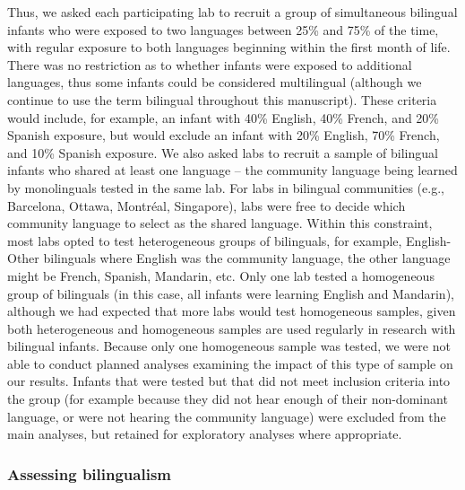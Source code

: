 \documentclass[,man,floatsintext]{apa6}
\begin{document}
Thus, we asked each participating lab to recruit a group of simultaneous bilingual infants who were exposed to two languages between 25\% and 75\% of the time, with regular exposure to both languages beginning within the first month of life. There was no restriction as to whether infants were exposed to additional languages, thus some infants could be considered multilingual (although we continue to use the term bilingual throughout this manuscript). These criteria would include, for example, an infant with 40\% English, 40\% French, and 20\% Spanish exposure, but would exclude an infant with 20\% English, 70\% French, and 10\% Spanish exposure. We also asked labs to recruit a sample of bilingual infants who shared at least one language -- the community language being learned by monolinguals tested in the same lab. For labs in bilingual communities (e.g., Barcelona, Ottawa, Montréal, Singapore), labs were free to decide which community language to select as the shared language. Within this constraint, most labs opted to test heterogeneous groups of bilinguals, for example, English-Other bilinguals where English was the community language, the other language might be French, Spanish, Mandarin, etc. Only one lab tested a homogeneous group of bilinguals (in this case, all infants were learning English and Mandarin), although we had expected that more labs would test homogeneous samples, given both heterogeneous and homogeneous samples are used regularly in research with bilingual infants. Because only one homogeneous sample was tested, we were not able to conduct planned analyses examining the impact of this type of sample on our results. Infants that were tested but that did not meet inclusion criteria into the group (for example because they did not hear enough of their non-dominant language, or were not hearing the community language) were excluded from the main analyses, but retained for exploratory analyses where appropriate.

\hypertarget{assessing-bilingualism}{%
\subsubsection{Assessing bilingualism}\label{assessing-bilingualism}}
\end{document}
